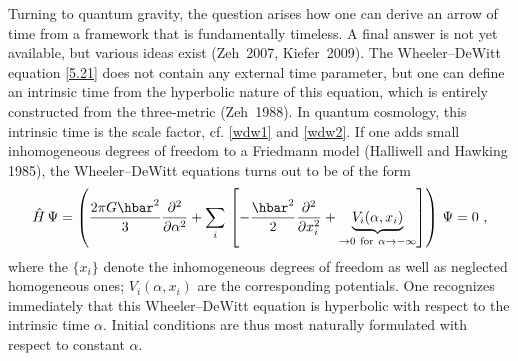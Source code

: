 \documentclass[12pt,a4paper]{article}
\newcommand{\lb}{\label}
\begin{document}
Turning to quantum gravity, the question arises how one can derive an
arrow of time from a framework that is fundamentally timeless. A final
answer is not yet available, but various ideas exist (Zeh~2007,
Kiefer~2009). The Wheeler--DeWitt equation \eqref{5.21} does not
contain any external time parameter, but one can define an intrinsic
time from the hyperbolic
nature of this equation, which is entirely constructed from the
three-metric (Zeh~1988). In quantum cosmology, this intrinsic time is
the scale factor, cf. \eqref{wdw1} and \eqref{wdw2}. 
If one adds small inhomogeneous degrees of freedom to a Friedmann
model (Halliwell and Hawking 1985), the Wheeler--DeWitt equations
turns out to be of the form
\begin{equation}
\lb{3WdW2}
 \hat{H} \, \Psi = \left(\frac{2\pi G\hbar^2}{3}
\frac{\partial^2}{\partial\alpha^2} + \sum_i \, \left[
-\frac{\hbar^2}{2}
\frac{\partial^2}{\partial x_i^2}+\underbrace{V_i(\alpha,x_i)}_{\to 0\ 
{\rm for}\ \alpha
\rightarrow -\infty}\right]\right) \, \Psi = 0 \ ,
\end{equation}
where the $\{ x_i\}$ denote the inhomogeneous
degrees of freedom as well as neglected homogeneous ones;
$V_i(\alpha,x_i)$ are the corresponding potentials. One
recognizes immediately that this Wheeler--DeWitt equation is
hyperbolic with respect to the intrinsic time $\alpha$. Initial
conditions are thus most naturally formulated with respect to constant
$\alpha$. 
\end{document}
